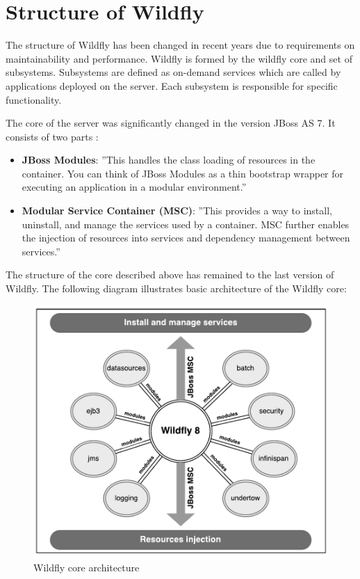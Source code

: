 \documentclass[12pt,oneside]{fithesis2}
\begin{document}
\section{Structure of Wildfly}
The structure of Wildfly has been changed in recent years due to requirements on maintainability and performance. Wildfly is formed by the wildfly core and set of subsystems. Subsystems are defined as on-demand services which are called by applications deployed on the server. Each subsystem is responsible for specific functionality.

The core of the server was significantly changed in the version JBoss AS 7. It consists of two parts \cite{jboss_as_book}:

\begin{itemize}
	\item \textbf{JBoss Modules}: ''This handles the class loading of resources in the container.
	You can think of JBoss Modules as a thin bootstrap wrapper for executing
	an application in a modular environment.''
	\item \textbf{Modular Service Container (MSC)}: ''This provides a way to install,
	uninstall, and manage the services used by a container. MSC further
	enables the injection of resources into services and dependency
	management between services.''
\end{itemize}

The structure of the core described above has remained to the last version of Wildfly. The following diagram illustrates basic architecture of the Wildfly core:

\begin{figure}[ht!]
	\centering
	\includegraphics[width=\textwidth]{images/wildfly_core}
	\caption{Wildfly core architecture \cite{wildfly_book}}
	\label{wildfly_core}
\end{figure}
\end{document}
